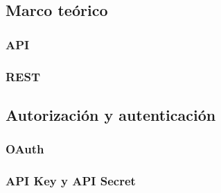 
\subsection{Marco teórico}
\label{marco_teorico}

\subsubsection{API}
\label{api}

\subsubsection{REST}
\label{rest}


\subsection{Autorización y autenticación}
\label{autorizacion_autenticacion}

\subsubsection{OAuth}
\label{oauth}

\subsubsection{API Key y API Secret}
\label{apikey}
